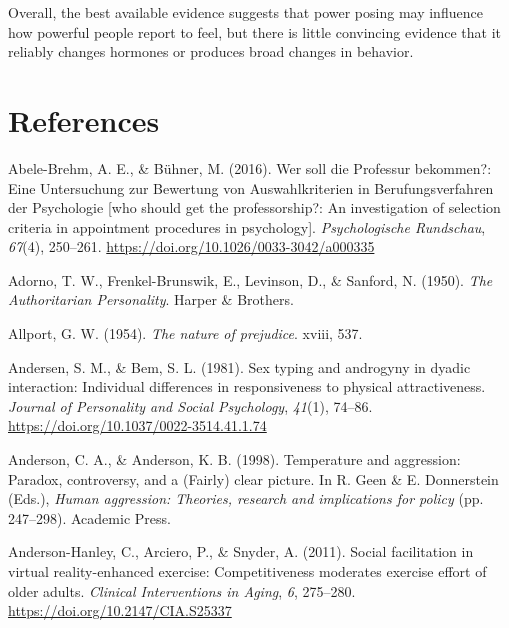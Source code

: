 \documentclass[
  letterpaper,
]{book}
\newlength{\cslhangindent}
\newenvironment{CSLReferences}[2] %
 {\begin{list}{}{%
  \setlength{\itemindent}{0pt}
  \setlength{\leftmargin}{0pt}
  \setlength{\parsep}{0pt}
  \ifodd #1
   \setlength{\leftmargin}{\cslhangindent}
   \setlength{\itemindent}{-1\cslhangindent}
  \fi
  \setlength{\itemsep}{#2\baselineskip}}}
 {\end{list}}
\begin{document}
Overall, the best available evidence suggests that power posing may
influence how powerful people report to feel, but there is little
convincing evidence that it reliably changes hormones or produces broad
changes in behavior.


\chapter*{References}\label{references}


\label{refs}
\begin{CSLReferences}{1}{0}
Abele-Brehm, A. E., \& Bühner, M. (2016). Wer soll die {Professur}
bekommen?: {Eine} {Untersuchung} zur {Bewertung} von {Auswahlkriterien}
in {Berufungsverfahren} der {Psychologie} {[}who should get the
professorship?: {An} investigation of selection criteria in appointment
procedures in psychology{]}. \emph{Psychologische Rundschau},
\emph{67}(4), 250--261. \url{https://doi.org/10.1026/0033-3042/a000335}

Adorno, T. W., Frenkel-Brunswik, E., Levinson, D., \& Sanford, N.
(1950). \emph{The {Authoritarian} {Personality}}. Harper \& Brothers.

Allport, G. W. (1954). \emph{The nature of prejudice}. xviii, 537.

Andersen, S. M., \& Bem, S. L. (1981). Sex typing and androgyny in
dyadic interaction: {Individual} differences in responsiveness to
physical attractiveness. \emph{Journal of Personality and Social
Psychology}, \emph{41}(1), 74--86.
\url{https://doi.org/10.1037/0022-3514.41.1.74}

Anderson, C. A., \& Anderson, K. B. (1998). Temperature and aggression:
{Paradox}, controversy, and a ({Fairly}) clear picture. In R. Geen \& E.
Donnerstein (Eds.), \emph{Human aggression: {Theories}, research and
implications for policy} (pp. 247--298). Academic Press.

Anderson-Hanley, C., Arciero, P., \& Snyder, A. (2011). Social
facilitation in virtual reality-enhanced exercise: Competitiveness
moderates exercise effort of older adults. \emph{Clinical Interventions
in Aging}, \emph{6}, 275--280. \url{https://doi.org/10.2147/CIA.S25337}


\end{CSLReferences}
\end{document}
